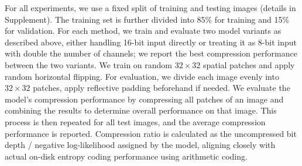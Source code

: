For all experiments, we use a fixed split of training and testing images (details in Supplement). The training set is further divided into 85\% for training and 15\% for validation. 
For each method, we train and evaluate two model variants as described above, either handling 16-bit input directly or treating it as 8-bit input with double the number of channels; we report the best compression performance between the two variants.
We train on random $32 \times 32$ spatial patches and apply random horizontal flipping.
For evaluation, we divide each image evenly into %
$32 \times 32$ patches, apply reflective padding beforehand if needed. We evaluate the model's compression performance by compressing all patches of an image and combining the results to determine overall performance on that image. This process is then repeated for all test images, and the average compression performance is reported. Compression ratio is calculated as the uncompressed bit depth / negative log-likelihood assigned by the model, aligning closely with actual on-disk entropy coding performance using arithmetic coding.

